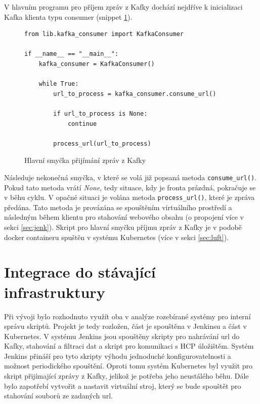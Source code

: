 \documentclass[thesis=M,czech,hidelinks]{FITthesis}[2013/05/06]
\begin{document}
V hlavním programu pro příjem zpráv z Kafky dochází nejdříve k inicializaci Kafka klienta typu consumer (snippet \ref{snip:kafkamain consum}).
\begin{figure}[h]               
	\begin{verbatim}
from lib.kafka_consumer import KafkaConsumer

if __name__ == "__main__":
    kafka_consumer = KafkaConsumer()
    
    while True:
        url_to_process = kafka_consumer.consume_url()

        if url_to_process is None:
            continue
        
        process_url(url_to_process)
	\end{verbatim}      
	\caption{Hlavní smyčka přijímání zpráv z Kafky}
	\label{snip:kafkamain consum}
\end{figure}
Následuje nekonečná smyčka, v které se volá již popsaná metoda \texttt{consume_url()}. Pokud tato metoda vrátí \textit{None}, tedy situace, kdy je fronta prázdná, pokračuje se v běhu cyklu. V opačné situaci je volána metoda \texttt{process_url()}, které je zpráva předána. Tato metoda je provázána se spouštěním virtuálního prostředí a následným během klientu pro stahování webového obsahu (o propojení více v sekci \ref{sec:jenk}).  Skript pro hlavní smyčku příjmu zpráv z Kafky je v podobě docker containeru spuštěn v systému Kubernetes (více v sekci \ref{sec:luft}). 





\section{Integrace do stávající infrastruktury} \label{sec:integrace}
Při vývoji bylo rozhodnuto využít oba v analýze rozebírané systémy pro interní správu skriptů. Projekt je tedy rozložen, část je spouštěna v Jenkinsu a část v Kubernetes. V systému Jenkins jsou spouštěny skripty pro nahrávání url do Kafky, stahování a filtraci dat a skript pro komunikaci s HCP úložištěm. Systém Jenkins přináší pro tyto skripty výhodu jednoduché konfigurovatelnosti a možnost periodického spouštění. Oproti tomu systém Kubernetes byl využit pro skript přijímající zprávy z Kafky, jelikož je potřeba jeho neustálého běhu. Dále bylo zapotřebí vytvořit a nastavit virtuální stroj, který se bude spouštět pro stahování souborů ze zadaných url.
\end{document}
